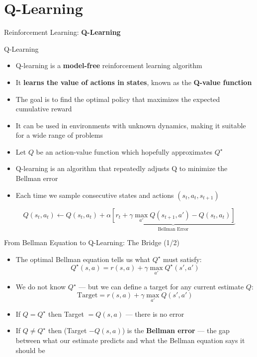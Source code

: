 \section{Q-Learning}
\begin{frame}{}
    \LARGE Reinforcement Learning: \textbf{Q-Learning}
\end{frame}

\begin{frame}[allowframebreaks]{Q-Learning}
    \begin{itemize}
        \item Q-learning is a \textbf{model-free} reinforcement learning algorithm
        \item It \textbf{learns the value of actions in states}, known as the \textbf{Q-value function}
        \item The goal is to find the optimal policy that maximizes the expected cumulative reward
        \item It can be used in environments with unknown dynamics, making it suitable for a wide range of problems
    \end{itemize}
\framebreak
    \begin{itemize}
        \item Let $Q$ be an action-value function which hopefully approximates $Q^{\star}$
        \item Q-learning is an algorithm that repeatedly adjusts Q to minimize the Bellman error
        \item Each time we sample consecutive states and actions $(s_t, a_t, s_{t+1})$
    \end{itemize}

    $$Q(s_t,a_t) \leftarrow Q(s_t,a_t) + \alpha \underbrace{\left [ r_t + \gamma \max_{a'} Q(s_{t+1},a') - Q(s_t,a_t) \right ]}_{\text{Bellman Error}}$$
    
\end{frame}

\begin{frame}{From Bellman Equation to Q-Learning: The Bridge (1/2)}
\begin{itemize}
    \item The optimal Bellman equation tells us what $Q^{\star}$ must satisfy:
    $$Q^{\star}(s,a) = r(s,a) + \gamma \max_{a'} Q^{\star}(s',a')$$
    \item We do not know $Q^{\star}$ --- but we can define a target for any current estimate $Q$:
    $$\text{Target} = r(s,a) + \gamma \max_{a'} Q(s',a')$$
    \item If $Q = Q^{\star}$ then Target $= Q(s,a)$ --- there is no error
    \item If $Q \neq Q^{\star}$ then (Target $- Q(s,a)$) is the \textbf{Bellman error} --- the gap between what our estimate predicts and what the Bellman equation says it should be
\end{itemize}
\end{frame}

